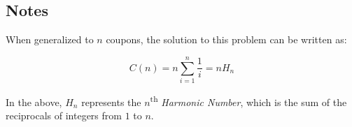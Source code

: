 \documentclass{article}
\begin{document}
\subsection{Notes}

When generalized to $n$ coupons, the solution to this 
problem can be written as:

$$
C(n) = n \sum_{i=1}^n \frac{1}{i} = nH_{n}
$$

In the above, $H_{n}$ represents the $n$\textsuperscript{th} 
\textit{Harmonic Number}, which is the sum of the reciprocals 
of integers from $1$ to $n$.
\end{document}
